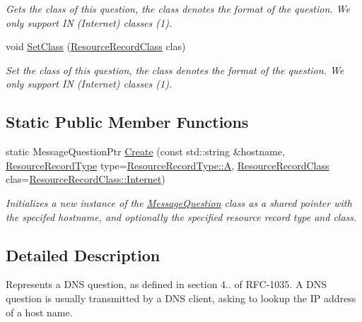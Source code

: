 \begin{DoxyCompactItemize}
\begin{DoxyCompactList}\small\item\em Gets the class of this question, the class denotes the format of the question. We only support I\-N (Internet) classes (1). \end{DoxyCompactList}\item 
void \hyperlink{class_senergy_1_1_dns_1_1_message_question_a8676f25315240afe4473154f3708d3e5}{Set\-Class} (\hyperlink{namespace_senergy_1_1_dns_a953f153bc411213d621d00c1e1b3eb9d}{Resource\-Record\-Class} clas)
\begin{DoxyCompactList}\small\item\em Set the class of this question, the class denotes the format of the question. We only support I\-N (Internet) classes (1). \end{DoxyCompactList}\end{DoxyCompactItemize}
\subsection*{Static Public Member Functions}
\begin{DoxyCompactItemize}
\item 
static Message\-Question\-Ptr \hyperlink{class_senergy_1_1_dns_1_1_message_question_ae8237696d15da3b4b67f96fbd3d1d3e3}{Create} (const std\-::string \&hostname, \hyperlink{namespace_senergy_1_1_dns_a590bfd748c955364770f5ce358d9dfe0}{Resource\-Record\-Type} type=\hyperlink{namespace_senergy_1_1_dns_a590bfd748c955364770f5ce358d9dfe0a7fc56270e7a70fa81a5935b72eacbe29}{Resource\-Record\-Type\-::\-A}, \hyperlink{namespace_senergy_1_1_dns_a953f153bc411213d621d00c1e1b3eb9d}{Resource\-Record\-Class} clas=\hyperlink{namespace_senergy_1_1_dns_a953f153bc411213d621d00c1e1b3eb9dac8205c7636e728d448c2774e6a4a944b}{Resource\-Record\-Class\-::\-Internet})
\begin{DoxyCompactList}\small\item\em Initializes a new instance of the \hyperlink{class_senergy_1_1_dns_1_1_message_question}{Message\-Question} class as a shared pointer with the specifed hostname, and optionally the specified resource record type and class. \end{DoxyCompactList}\end{DoxyCompactItemize}


\subsection{Detailed Description}
Represents a D\-N\-S question, as defined in section 4.. of R\-F\-C-\/1035. A D\-N\-S question is usually transmitted by a D\-N\-S client, asking to lookup the I\-P address of a host name. 

